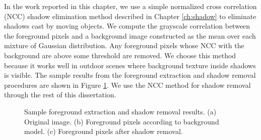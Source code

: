 In the work reported in this chapter, we use a simple normalized cross
correlation (NCC) shadow elimination method described in
Chapter \ref{ch:shadow} to eliminate shadows cast by moving objects.
We compute the grayscale correlation between the foreground pixels and
a background image constructed as the mean over each mixture of
Gaussian distribution. Any foreground pixels whose NCC with the
background are above some threshold are removed. We choose this method
because it works well in outdoor scenes where background texture
inside shadows is visible.  The sample results from the foreground
extraction and shadow removal procedures are shown in
Figure \ref{fig:shadow-result}. We use the NCC method for shadow
removal through the rest of this dissertation.

\begin{figure}
  \centering
  \hspace{0.1in}
  \hspace{0.1in}
  \caption[Sample foreground extraction and shadow removal
    results.]{\small Sample foreground extraction and shadow removal
    results.  (a) Original image. (b) Foreground pixels according to
    background model. (c) Foreground pixels after shadow removal.}
  \label{fig:shadow-result}
\end{figure}

